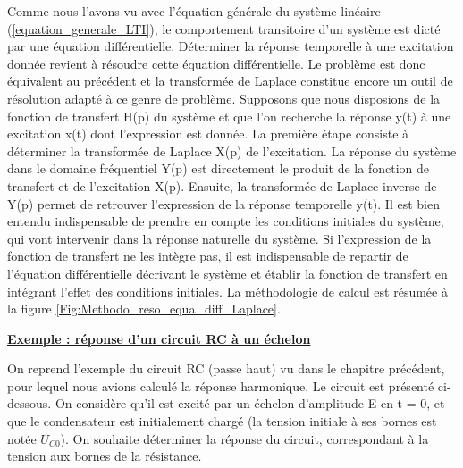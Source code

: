 	
	Comme nous l'avons vu avec l'équation générale du système linéaire (\ref{equation_generale_LTI}), le comportement transitoire d'un système est dicté par une équation différentielle. Déterminer la réponse temporelle à une excitation donnée revient à résoudre cette équation différentielle. Le problème est donc équivalent au précédent et la transformée de Laplace constitue encore un outil de résolution adapté à ce genre de problème. Supposons que nous disposions de la fonction de transfert H(p) du système et que l'on recherche la réponse y(t) à une excitation x(t) dont l'expression est donnée. La première étape consiste à déterminer la transformée de Laplace X(p) de l'excitation. La réponse du système dans le domaine fréquentiel Y(p) est directement le produit de la fonction de transfert et de l'excitation X(p). Ensuite, la transformée de Laplace inverse de Y(p) permet de retrouver l'expression de la réponse temporelle y(t).
	Il est bien entendu indispensable de prendre en compte les conditions initiales du système, qui vont intervenir dans la réponse naturelle du système. Si l'expression de la fonction de transfert ne les intègre pas, il est indispensable de repartir de l'équation différentielle décrivant le système et établir la fonction de transfert en intégrant l'effet des conditions initiales. La méthodologie de calcul est résumée à la figure \ref{Fig:Methodo_reso_equa_diff_Laplace}.
	
	\vspace{1\baselineskip}
	
	
	\textbf{\underline{Exemple : réponse d'un circuit RC à un échelon}}
	
	On reprend l'exemple du circuit RC (passe haut) vu dans le chapitre précédent, pour lequel nous avions calculé la réponse harmonique. Le circuit est présenté ci-dessous.
	On considère qu'il est excité par un échelon d'amplitude E en t = 0, et que le condensateur est initialement chargé (la tension initiale à ses bornes est notée $U_{C0}$). On souhaite déterminer la réponse du circuit, correspondant à la tension aux bornes de la résistance.

